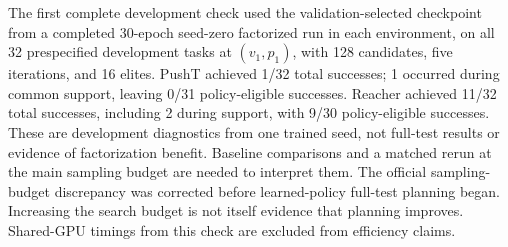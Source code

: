 The first complete development check used the validation-selected checkpoint
from a completed 30-epoch seed-zero factorized run in each environment, on
all 32 prespecified development tasks at $(v_1,p_1)$, with 128 candidates,
five iterations, and 16 elites. PushT achieved 1/32
total successes; 1 occurred during common support,
leaving 0/31 policy-eligible
successes. Reacher achieved 11/32 total successes,
including 2 during support, with
9/30 policy-eligible successes.
These are development diagnostics from one trained seed, not full-test
results or evidence of factorization benefit. Baseline comparisons and a
matched rerun at the main sampling budget are needed to interpret them.
The official sampling-budget discrepancy was corrected before learned-policy
full-test planning began. Increasing the search budget is not itself evidence
that planning improves. Shared-GPU timings from this check are excluded
from efficiency claims.
